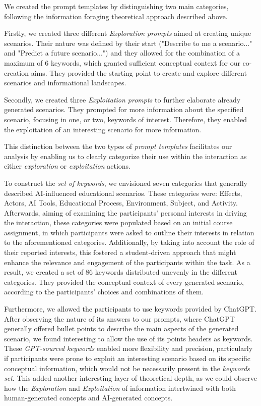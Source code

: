 \documentclass[sn-mathphys, Numbered]{sn-jnl}%
\theoremstyle{thmstyleone}%
\theoremstyle{thmstyletwo}%
\theoremstyle{thmstylethree}%
\begin{document}
We created the prompt templates by distinguishing two main categories, following the information foraging theoretical approach described above. 

Firstly, we created three different \textit{Exploration prompts} aimed at creating unique scenarios. Their nature was defined by their start ("Describe to me a scenario..." and "Predict a future scenario...") and they allowed for the combination of a maximum of 6 keywords, which granted sufficient conceptual context for our co-creation aims. They provided the starting point to create and explore different scenarios and informational landscapes.

Secondly, we created three \textit{Exploitation prompts} to further elaborate already generated scenarios. They prompted for more information about the specified scenario, focusing in one, or two, keywords of interest. Therefore, they enabled the exploitation of an interesting scenario for more information.

This distinction between the two types of \textit{prompt templates} facilitates our analysis by enabling us to clearly categorize their use within the interaction as either \textit{exploration} or \textit{exploitation} actions.

To construct the \textit{set of keywords}, we envisioned seven categories that generally described AI-influenced educational scenarios. These categories were: Effects, Actors, AI Tools, Educational Process, Environment, Subject, and Activity. Afterwards, aiming of examining the participants' personal interests in driving the interaction, these categories were populated based on an initial course assignment, in which participants were asked to outline their interests in relation to the aforementioned categories. Additionally, by taking into account the role of their reported interests, this fostered a student-driven approach that might enhance the relevance and engagement of the participants within the task. As a result, we created a set of 86 keywords distributed unevenly in the different categories. They provided the conceptual context of every generated scenario, according to the participants' choices and combinations of them.

Furthermore, we allowed the participants to use keywords provided by ChatGPT. After observing the nature of its answers to our prompts, where ChatGPT generally offered bullet points to describe the main aspects of the generated scenario, we found interesting to allow the use of its points headers as keywords. These \textit{GPT-sourced keywords} enabled more flexibility and precision, particularly if participants were prone to exploit an interesting scenario based on its specific conceptual information, which would not be necessarily present in the \textit{keywords set}. This added another interesting layer of theoretical depth, as we could observe how the \textit{Exploration} and \textit{Exploitation} of information intertwined with both human-generated concepts and AI-generated concepts.
\end{document}
